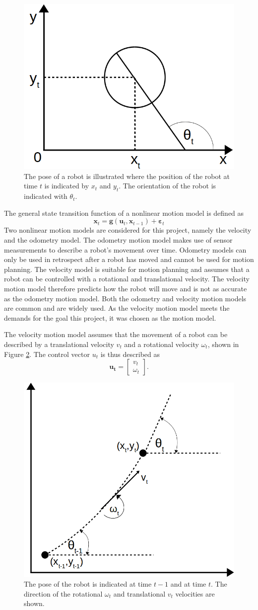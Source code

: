 \documentclass[12pt,oneside,openany,a4paper, %
afrikaans,english,
]{memoir}
\numberwithin{equation}{chapter}
\begin{document}
{\begin{figure}[H]
  \includegraphics[width=0.4\linewidth]{Figures/pose_robot.png}
  \centering
  \caption[Robot pose]{The pose of a robot is illustrated where the position of the robot at time $t$ is indicated by $x_t$ and $y_t$. The orientation of the robot is indicated with $\theta_t$.}
  \label{fig:pose_robot}
\end{figure}
The general state transition function of a nonlinear motion model is defined as
\begin{equation}
\bm{x}_t = \bm{g}(\bm{u}_t, \bm{x}_{t-1}) + \bm{\varepsilon}_t
\end{equation}
Two nonlinear motion models are considered for this project, namely the velocity and the odometry model. The odometry motion model makes use of sensor measurements to describe a robot's movement over time. Odometry models can  only be used in retrospect after a robot has moved and cannot be used for motion planning. The velocity model is suitable for motion planning and assumes that a robot can be controlled with a rotational and translational velocity. The velocity motion model therefore predicts how the robot will move and is not as accurate as the odometry motion model. Both the odometry and velocity motion models are common and are widely used. As the velocity motion model meets the demands for the goal this project, it was chosen as the motion model.

The velocity motion model assumes that the movement of a robot can be described by a translational velocity $v_t$ and a rotational velocity $\omega_t$, shown in Figure \ref{fig:vel_model}. The control vector $u_t$ is thus described as
\begin{equation}
\bm{u_t} = 
\begin{bmatrix}
v_t\\
\omega_t
\end{bmatrix}.
\end{equation}
\begin{figure}
  \includegraphics[width=0.4\linewidth]{Figures/velocity_model.png}
  \centering
  \caption[Velocity motion model]{The pose of the robot is indicated at time $t-1$ and at time $t$. The direction of the rotational $\omega_t$ and translational $v_t$ velocities are shown.}
  \label{fig:vel_model}
\end{figure}

}
\end{document}
